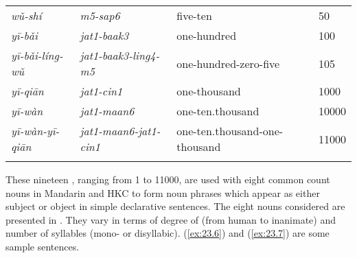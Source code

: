 \documentclass[output=paper]{langsci/langscibook}
\begin{document}
\begin{table}
\begin{tabularx}{\textwidth}{@{}llll}
\emph{wǔ-shí}         & \emph{m5-sap6}              & five-ten                      & 50\\
\emph{yī-bǎi}         & \emph{jat1-baak3}           & one-hundred                   & 100\\
\emph{yī-bǎi-líng-wǔ} & \emph{jat1-baak3-ling4-m5}  & one-hundred-zero-five         & 105\\
\emph{yī-qiān}        & \emph{jat1-cin1}            & one-thousand                  & 1000\\
\emph{yī-wàn}         & \emph{jat1-maan6}           & one-ten.thousand              & 10000\\
\emph{yī-wàn-yī-qiān} & \emph{jat1-maan6-jat1-cin1} & one-ten.thousand-one-thousand & 11000\\
\lspbottomrule
\end{tabularx}
\end{table}

These nineteen , ranging from 1 to 11000, are used with eight common
count nouns in Mandarin and \gls{HKC} to form noun phrases which appear as
either subject or object in simple declarative sentences. The eight nouns
considered are presented in . They vary in terms of degree
of  (from human to inanimate) and number of syllables (mono- or
disyllabic). (\ref{ex:23.6}) and (\ref{ex:23.7}) are some sample sentences.
\end{document}
